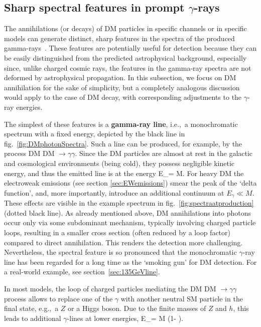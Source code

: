 \subsection{Sharp spectral features in prompt $\gamma$-rays}\label{sec:modeldepgammas}
The annihilations (or decays) of DM particles in specific channels or in specific models can generate distinct, sharp features in the spectra of the produced gamma-rays~\cite{sharpfeatures}. These features are potentially useful for detection because they can be easily distinguished from the predicted astrophysical  background,
especially since, unlike charged cosmic rays, the features in the gamma-ray spectra are not deformed by astrophysical propagation. 
In this subsection, we focus on DM annihilation for the sake of simplicity, but a completely analogous discussion would apply to the case of DM decay, with corresponding adjustments to the $\gamma$-ray energies.

\medskip

The simplest of these features is a {\bf gamma-ray line}, i.e.,~a monochromatic spectrum with a fixed energy, depicted by the black line in fig.~\ref{fig:DMphotonSpectra}. Such a line can be produced, for example, by the process DM DM $\to \gamma \gamma$. 
Since the DM particles are almost at rest in the galactic and cosmological environments (being cold), they possess negligible kinetic energy, and thus the emitted line is at the energy
\beq
E_\gamma = M.
\eeq
For heavy DM the electroweak emissions (see section \ref{sec:EWemissions}) smear the peak of the `delta function', and, more importantly, introduce an additional continuum at $E_\gamma \ll M $. 
These effects are visible in the example spectrum in fig.~\ref{fig:spectraatproduction} (dotted black line). 
As already mentioned above, DM annihilations into photons
occur only via some subdominant mechanism, typically 
 involving charged particle loops,
resulting in a smaller cross section (often reduced by a loop factor) compared to direct annihilation. This renders the detection more challenging.
Nevertheless, the spectral feature is so pronounced that the monochromatic $\gamma$-ray line has been regarded for a long time as the `smoking gun' for DM detection. For a real-world example, see section~\ref{sec:135GeVline}.


\smallskip

In most models, the loop of charged particles mediating the DM DM $\to \gamma \gamma$ process allows to replace one of the $\gamma$ with another neutral SM particle in the final state, e.g.,~a $Z$ or a Higgs boson. 
Due to the finite masses of $Z$ and $h$, this leads to additional $\gamma$-lines at lower energies,
\beq
E_\gamma = M  \left(1-  \right).
\eeq


